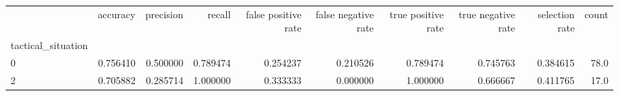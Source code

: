 \begin{tabular}{lrrrrrrrrr}
\toprule
{} &  accuracy &  precision &    recall &  false positive rate &  false negative rate &  true positive rate &  true negative rate &  selection rate &  count \\
tactical\_situation &           &            &           &                      &                      &                     &                     &                 &        \\
\midrule
0                  &  0.756410 &   0.500000 &  0.789474 &             0.254237 &             0.210526 &            0.789474 &            0.745763 &        0.384615 &   78.0 \\
2                  &  0.705882 &   0.285714 &  1.000000 &             0.333333 &             0.000000 &            1.000000 &            0.666667 &        0.411765 &   17.0 \\
\bottomrule
\end{tabular}
